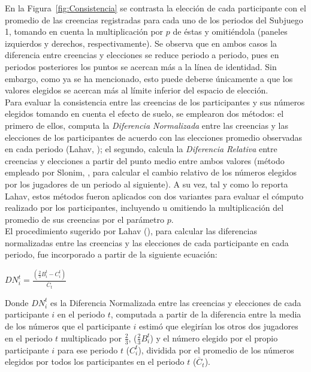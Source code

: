 En la Figura~\ref{fig:Consistencia} se contrasta la elección de cada participante con el promedio de las creencias registradas para cada uno de los periodos del Subjuego 1, tomando en cuenta la multiplicación por $p$ de éstas y omitiéndola (paneles izquierdos y derechos, respectivamente). Se observa que en ambos casos la diferencia entre creencias y elecciones se reduce periodo a periodo, pues en periodos posteriores los puntos se acercan más a la línea de identidad. Sin embargo, como ya se ha mencionado, esto puede deberse únicamente a que los valores elegidos se acercan más al límite inferior del espacio de elección.\\

Para evaluar la consistencia entre las creencias de los participantes y sus números elegidos tomando en cuenta el efecto de suelo, se emplearon dos métodos: el primero de ellos, computa la \textit{Diferencia Normalizada} entre las creencias y las elecciones de los participantes de acuerdo con las elecciones promedio observadas en cada periodo (Lahav, \citeyear{Lahav}); el segundo, calcula la \textit{Diferencia Relativa} entre creencias y elecciones a partir del punto medio entre ambos valores (método empleado por Slonim, \citeyear{Slonim}, para calcular el cambio relativo de los números elegidos por los jugadores de un periodo al siguiente). A su vez, tal y como lo reporta Lahav, estos métodos fueron aplicados con dos variantes para evaluar el cómputo realizado por los participantes, incluyendo u omitiendo la multiplicación del promedio de sus creencias por el parámetro $p$.\\

El procedimiento sugerido por Lahav (\citeyear{Lahav}), para calcular las diferencias normalizadas entre las creencias y las elecciones de cada participante en cada periodo, fue incorporado a partir de la siguiente ecuación:\\

\begin{center}
$DN_i^t =  \frac{(\frac{2}{3}B_i^t - C_i^t)}{\overline{C}_t} $
\end{center}

Donde $DN_i^t$ es la Diferencia Normalizada entre las creencias y elecciones de cada participante $i$ en el periodo $t$, computada a partir de la diferencia entre  la media de los números que el participante $i$ estimó que elegirían los otros dos jugadores en el periodo $t$ multiplicado por $\frac{2}{3}$, ($\frac{2}{3}B_i^t$) y el número elegido por el propio participante $i$ para ese periodo $t$ ($C_i^t$), dividida por el promedio de los números elegidos por todos los participantes en el periodo $t$ ($\overline{C}_t$).\\

